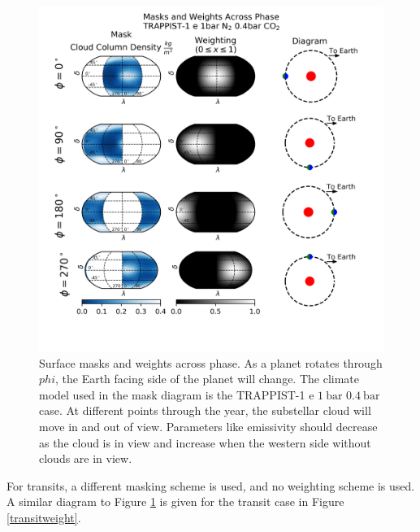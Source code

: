 \begin{figure}[ht]
    \includegraphics[width=\textwidth]{methods/phases_weights.png}
    \caption[Surface Masks and Weights Across Phases]{Surface masks and weights
    across phase. As a planet rotates through $phi$, the Earth facing side of
    the planet will change. The climate model used in the mask diagram is the
    TRAPPIST-1 e $\SI{1}{\bar}$  $\SI{0.4}{\bar}$  case.
    At different points
    through the year, the substellar cloud will move in and out of view.
    Parameters like emissivity should decrease as the cloud is in view and
    increase when the western side without clouds are in view.}
    \label{maskweight}
\end{figure}

For transits, a different masking scheme is used, and no weighting
 scheme is used. A similar diagram to Figure \ref{maskweight} is given for the
 transit case in Figure \ref{transitweight}.

